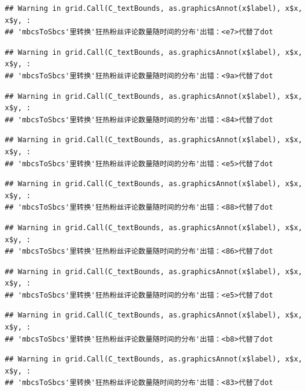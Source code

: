 \documentclass[
]{article}
\begin{document}
\begin{verbatim}
## Warning in grid.Call(C_textBounds, as.graphicsAnnot(x$label), x$x, x$y, :
## 'mbcsToSbcs'里转换'狂热粉丝评论数量随时间的分布'出错：<e7>代替了dot
\end{verbatim}

\begin{verbatim}
## Warning in grid.Call(C_textBounds, as.graphicsAnnot(x$label), x$x, x$y, :
## 'mbcsToSbcs'里转换'狂热粉丝评论数量随时间的分布'出错：<9a>代替了dot
\end{verbatim}

\begin{verbatim}
## Warning in grid.Call(C_textBounds, as.graphicsAnnot(x$label), x$x, x$y, :
## 'mbcsToSbcs'里转换'狂热粉丝评论数量随时间的分布'出错：<84>代替了dot
\end{verbatim}

\begin{verbatim}
## Warning in grid.Call(C_textBounds, as.graphicsAnnot(x$label), x$x, x$y, :
## 'mbcsToSbcs'里转换'狂热粉丝评论数量随时间的分布'出错：<e5>代替了dot
\end{verbatim}

\begin{verbatim}
## Warning in grid.Call(C_textBounds, as.graphicsAnnot(x$label), x$x, x$y, :
## 'mbcsToSbcs'里转换'狂热粉丝评论数量随时间的分布'出错：<88>代替了dot
\end{verbatim}

\begin{verbatim}
## Warning in grid.Call(C_textBounds, as.graphicsAnnot(x$label), x$x, x$y, :
## 'mbcsToSbcs'里转换'狂热粉丝评论数量随时间的分布'出错：<86>代替了dot
\end{verbatim}

\begin{verbatim}
## Warning in grid.Call(C_textBounds, as.graphicsAnnot(x$label), x$x, x$y, :
## 'mbcsToSbcs'里转换'狂热粉丝评论数量随时间的分布'出错：<e5>代替了dot
\end{verbatim}

\begin{verbatim}
## Warning in grid.Call(C_textBounds, as.graphicsAnnot(x$label), x$x, x$y, :
## 'mbcsToSbcs'里转换'狂热粉丝评论数量随时间的分布'出错：<b8>代替了dot
\end{verbatim}

\begin{verbatim}
## Warning in grid.Call(C_textBounds, as.graphicsAnnot(x$label), x$x, x$y, :
## 'mbcsToSbcs'里转换'狂热粉丝评论数量随时间的分布'出错：<83>代替了dot
\end{verbatim}
\end{document}
